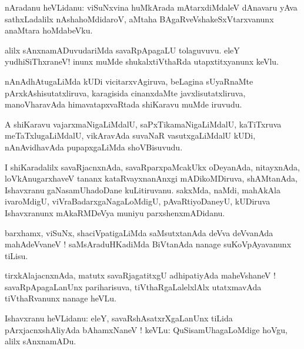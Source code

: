 \documentclass{article}
\begin{document}

\begin{mn}
nAradanu heVLidanu: viSuNxvina huMkArada mAtarxdiMdaleV dAnavaru yAva sathxLadalilx 
nAshahoMdidaroV, aMtaha BAgaRveVshakeSxVtarxvanunx anaMtara hoMdabeVku.
\end{mn}

\begin{mn}
alilx sAnxnamADuvudariMda savaRpApagaLU tolaguvuvu. eleY yudhiSiThxraneV! inunx muMde 
shukalxtiVthaRda utapxtitxyanunx keVlu.
\end{mn}

\begin{mn}
nAnAdhAtugaLiMda kUDi vicitarxvAgiruva, beLagina sUyaRnaMte pArxkAshisutatxliruva, karagisida 
cinanxdaMte javxlisutatxliruva, manoVharavAda himavatapxvaRtada shiKaravu muMde iruvudu.
\end{mn}

\begin{mn}
A shiKaravu vajarxmaNigaLiMdalU, saPxTikamaNigaLiMdalU, kaTiTxruva meTaTxlugaLiMdalU, vikAravAda 
suvaNaR vasutxgaLiMdalU kUDi, nAnAvidhavAda pupapxgaLiMda shoVBisuvudu.
\end{mn}

\begin{mn}
I shiKaradalilx savaRjacnxnAda, savaRparxpaMcakUkx oDeyanAda, nitayxnAda, loVkAnugarxhaveV tananx 
kataRvayxnanAnxgi mADikoMDiruva, shAMtanAda, Ishavxranu gaNasamUhadoDane kuLitiruvanu. sakxMda, 
naMdi, mahAkAla ivaroMdigU, viVraBadarxgaNagaLoMdigU, pAvaRtiyoDaneyU, kUDiruva Ishavxranunx 
mAkaRMDeVya muniyu parxshenxmADidanu.
\end{mn}

\begin{mn}
barxhamx, viSuNx, shaciVpatigaLiMda saMsutxtanAda deVva deVvanAda mahAdeVvaneV ! 
saMsAraduHKadiMda BiVtanAda nanage suKoVpAyavanunx tiLisu.
\end{mn}

\begin{mn}
tirxkAlajacnxnAda, matutx savaRjagatitxgU adhipatiyAda maheVshaneV !  savaRpApagaLanUnx 
pariharisuva, tiVthaRgaLalelxlAlx utatxmavAda tiVthaRvanunx nanage heVLu.
\end{mn}

\begin{mn}
Ishavxranu heVLidanu: eleY, savaRshAsatxrXgaLanUnx tiLida pArxjacnxshAliyAda bAhamxNaneV ! keVLu:
QuSisamUhagaLoMdige hoVgu, alilx sAnxnamADu.
\end{mn}
\end{document}
